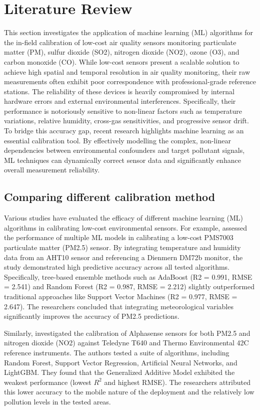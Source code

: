 \section{Literature Review}
This section investigates the application of machine learning (ML) algorithms for the in-field calibration of low-cost air quality sensors monitoring particulate matter (PM), sulfur dioxide (SO2), nitrogen dioxide (NO2), ozone (O3), and carbon monoxide (CO). While low-cost sensors present a scalable solution to achieve high spatial and temporal resolution in air quality monitoring, their raw measurements often exhibit poor correspondence with professional-grade reference stations. The reliability of these devices is heavily compromised by internal hardware errors and external environmental interferences. Specifically, their performance is notoriously sensitive to non-linear factors such as temperature variations, relative humidity, cross-gas sensitivities, and progressive sensor drift. To bridge this accuracy gap, recent research highlights machine learning as an essential calibration tool. By effectively modelling the complex, non-linear dependencies between environmental confounders and target pollutant signals, ML techniques can dynamically correct sensor data and significantly enhance overall measurement reliability. 

\subsection{Comparing different calibration method} %

Various studies have evaluated the efficacy of different machine learning (ML) algorithms in calibrating low-cost environmental sensors. For example, \cite{Tastan_2025} assessed the performance of multiple ML models in calibrating a low-cost PMS7003 particulate matter (PM2.5) sensor. By integrating temperature and humidity data from an AHT10 sensor and referencing a Dienmern DM72b monitor, the study demonstrated high predictive accuracy across all tested algorithms. Specifically, tree-based ensemble methods such as AdaBoost (R2 = 0.991, RMSE = 2.541) and Random Forest (R2 = 0.987, RMSE = 2.212) slightly outperformed traditional approaches like Support Vector Machines (R2 = 0.977, RMSE = 2.647). The researchers concluded that integrating meteorological variables significantly improves the accuracy of PM2.5 predictions. 

Similarly, \cite{Wang_2023} investigated the calibration of Alphasense sensors for both PM2.5 and nitrogen dioxide (NO2) against Teledyne T640 and Thermo Environmental 42C reference instruments. The authors tested a suite of algorithms, including Random Forest, Support Vector Regression, Artificial Neural Networks, and LightGBM. They found that the Generalized Additive Model exhibited the weakest performance (lowest $R^2$ and highest RMSE). The researchers attributed this lower accuracy to the mobile nature of the deployment and the relatively low pollution levels in the tested areas. 


